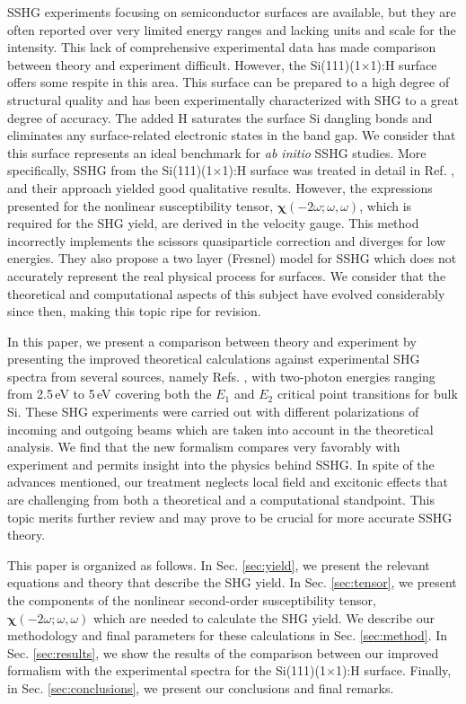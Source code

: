 \documentclass[prb,superscriptaddress,showpacs,twocolumn,letterpaper]{revtex4}
\begin{document}
SSHG experiments focusing on semiconductor surfaces are available, but they are
often reported over very limited energy ranges and lacking units and scale for
the intensity. This lack of comprehensive experimental data has made comparison
between theory and experiment difficult. However, the Si(111)(1$\times$1):H
surface offers some respite in this area. This surface can be prepared to a high
degree of structural quality and has been experimentally characterized with SHG
to a great degree of accuracy.\cite{mitchellSS01, mejiaPRB02} The added H
saturates the surface Si dangling bonds and eliminates any surface-related
electronic states in the band gap. We consider that this surface represents an
ideal benchmark for \emph{ab initio} SSHG studies. More specifically, SSHG from
the Si(111)(1$\times$1):H surface was treated in detail in Ref.
, and their approach yielded good qualitative results.
However, the expressions presented for the nonlinear susceptibility tensor,
$\boldsymbol{\chi}(-2\omega;\omega,\omega)$, which is required for the SHG
yield, are derived in the velocity gauge. This method incorrectly implements the
scissors quasiparticle correction and diverges for low
energies.\cite{cabellosPRB09} They also propose a two layer (Fresnel) model for
SSHG which does not accurately represent the real physical process for surfaces.
We consider that the theoretical and computational aspects of this subject have
evolved considerably since then, making this topic ripe for revision.

In this paper, we present a comparison between theory and experiment by
presenting the improved theoretical calculations against experimental SHG
spectra from several sources, namely Refs. , with two-photon energies ranging from
2.5\,eV to 5\,eV covering both the $E_{1}$ and $E_{2}$ critical point
transitions for bulk Si. These SHG experiments were carried out with different
polarizations of incoming and outgoing beams which are taken into account in the
theoretical analysis. We find that the new formalism compares very favorably
with experiment and permits insight into the physics behind SSHG. In spite of
the advances mentioned, our treatment neglects local field and excitonic effects
that are challenging from both a theoretical and a computational standpoint.
This topic merits further review and may prove to be crucial for more accurate
SSHG theory.

This paper is organized as follows. In Sec. \ref{sec:yield}, we present the
relevant equations and theory that describe the SHG yield. In Sec.
\ref{sec:tensor}, we present the components of the nonlinear second-order
susceptibility tensor, $\boldsymbol{\chi}(-2\omega;\omega,\omega)$ which are
needed to calculate the SHG yield. We describe our methodology and final
parameters for these calculations in Sec. \ref{sec:method}. In Sec.
\ref{sec:results}, we show the results of the comparison between our improved
formalism with the experimental spectra for the Si(111)(1$\times$1):H surface.
Finally, in Sec. \ref{sec:conclusions}, we present our conclusions and final
remarks.
\end{document}
